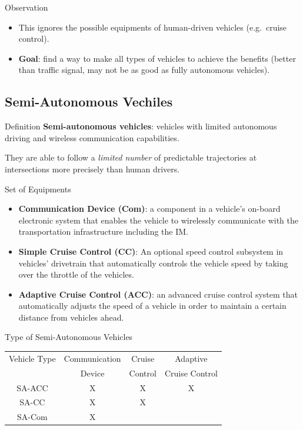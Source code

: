 \documentclass{beamer}
\begin{document}
\begin{frame}{Observation}
\begin{itemize}
\item This ignores the possible equipments of human-driven vehicles
(e.g.\ cruise control).\pause
\item \textbf{Goal}: find a way to make all types of vehicles to
achieve the benefits (better than traffic signal, may not be as good
as fully autonomous vehicles).
\end{itemize}
\end{frame}

\subsection{Semi-Autonomous Vechiles}

\begin{frame}{Definition}
\textbf{Semi-autonomous vehicles}: vehicles with limited autonomous
driving and wireless communication capabilities.\pause

\hfill

They are able to follow a \textit{limited number} of predictable
trajectories at intersections more precisely than human drivers.
\end{frame}

\begin{frame}{Set of Equipments}
\begin{itemize}
\item \textbf{Communication Device (Com)}:
a component in a vehicle's on-board electronic system that enables the
vehicle to wirelessly communicate with the transportation
infrastructure including the IM.\pause
\item \textbf{Simple Cruise Control (CC)}:
An optional speed control subsystem in vehicles' drivetrain that
automatically controls the vehicle speed by taking over the throttle
of the vehicles.\pause
\item \textbf{Adaptive Cruise Control (ACC)}:
an advanced cruise control system that automatically adjusts the speed
of a vehicle in order to maintain a certain distance from vehicles
ahead.
\end{itemize}
\end{frame}

\begin{frame}{Type of Semi-Autonomous Vehicles}
\begin{tabular}{|c|c|c|c|}
  \hline
  Vehicle Type & Communication & Cruise & Adaptive \\
               & Device & Control & Cruise Control \\
  \hline
  SA-ACC & X & X & X  \\
  \hline
  SA-CC & X & X &  \\
  \hline
  SA-Com & X & &  \\
  \hline
\end{tabular}
\end{frame}
\end{document}
